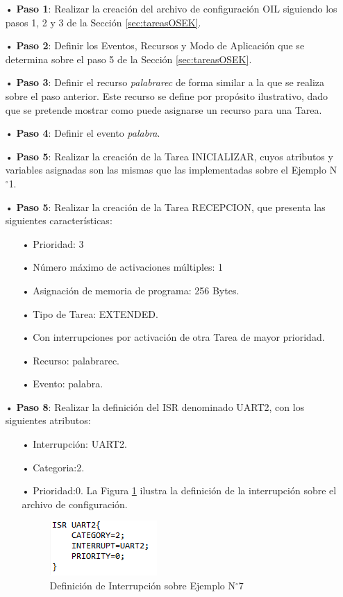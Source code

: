\documentclass[12pt,letterpaper]{article}
\begin{document}
\begin{enumerate}

\item[•]\textbf{Paso 1}: Realizar la creación del archivo de configuración OIL siguiendo los pasos 1, 2 y 3 de la Sección \ref{sec:tareasOSEK}.
\item[•]\textbf{Paso 2}: Definir los Eventos, Recursos y Modo de Aplicación que se determina sobre el paso 5 de la Sección \ref{sec:tareasOSEK}.
\item[•]\textbf{Paso 3}: Definir el recurso \textit{palabrarec} de forma similar a la que se realiza sobre el paso anterior. Este recurso se define por propósito ilustrativo, dado que se pretende mostrar como puede asignarse un recurso para una Tarea.
\item[•]\textbf{Paso 4}: Definir el evento \textit{palabra}.
\item[•]\textbf{Paso 5}: Realizar la creación de la Tarea INICIALIZAR, cuyos atributos y variables asignadas son las mismas que las implementadas sobre el Ejemplo N$^{\circ}$1.

\item[•]\textbf{Paso 5}: Realizar la creación de la Tarea RECEPCION, que presenta las siguientes características:
\begin{enumerate}
\item[•]Prioridad: 3
\item[•]Número máximo de activaciones múltiples: 1
\item[•]Asignación de memoria de programa: 256 Bytes.
\item[•]Tipo de Tarea: EXTENDED.
\item[•]Con interrupciones por activación de otra Tarea de mayor prioridad.
\item[•]Recurso: palabrarec.
\item[•]Evento: palabra.
\end{enumerate}

\item[•]\textbf{Paso 8}: Realizar la definición del ISR denominado UART2, con los siguientes atributos:
\begin{enumerate}
\item[•]Interrupción: UART2.
\item[•]Categoria:2.
\item[•]Prioridad:0. La Figura \ref{Fig44} ilustra la definición de la interrupción sobre el archivo de configuración.
\begin{figure}[H]
\centering
\includegraphics[width=5 cm]{figuras/f35.png}
\caption{Definición de Interrupción sobre Ejemplo N$^{\circ}$7}
\label{Fig44}
\end{figure}
\end{enumerate}


\end{enumerate}
\end{document}

